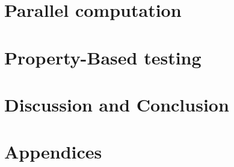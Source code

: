 \documentclass[oneside]{book}
\begin{document}


\epigraphhead[450]{}
\part{Parallel computation}


\epigraphhead[450]{}
\part{Property-Based testing}


\epigraphhead[450]{}
\part{Discussion and Conclusion}


\renewcommand\bibname{References}




\epigraphhead[450]{}
\part{Appendices}

\end{document}
